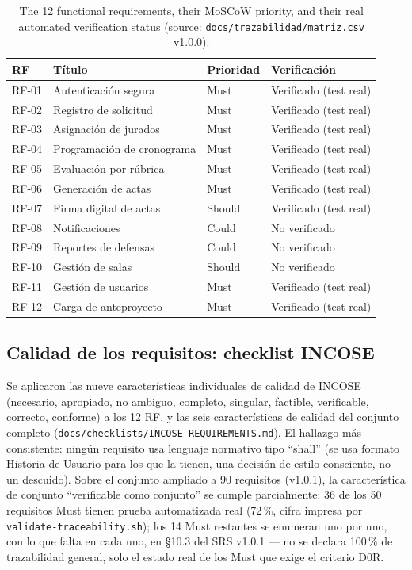 \begin{table}[H]
\centering
\small
\begin{tabular}{p{1.2cm}p{5.5cm}p{1.6cm}p{2.5cm}}
\toprule
\textbf{RF} & \textbf{Título} & \textbf{Prioridad} & \textbf{Verificación} \\
\midrule
RF-01 & Autenticación segura & Must & Verificado (test real) \\
RF-02 & Registro de solicitud & Must & Verificado (test real) \\
RF-03 & Asignación de jurados & Must & Verificado (test real) \\
RF-04 & Programación de cronograma & Must & Verificado (test real) \\
RF-05 & Evaluación por rúbrica & Must & Verificado (test real) \\
RF-06 & Generación de actas & Must & Verificado (test real) \\
RF-07 & Firma digital de actas & Should & Verificado (test real) \\
RF-08 & Notificaciones & Could & No verificado \\
RF-09 & Reportes de defensas & Could & No verificado \\
RF-10 & Gestión de salas & Should & No verificado \\
RF-11 & Gestión de usuarios & Must & Verificado (test real) \\
RF-12 & Carga de anteproyecto & Must & Verificado (test real) \\
\bottomrule
\end{tabular}
\caption{The 12 functional requirements, their MoSCoW priority, and their real automated
verification status (source: \texttt{docs/trazabilidad/matriz.csv} v1.0.0).}
\label{tab:rf-resumen}
\end{table}

\subsection{Calidad de los requisitos: checklist INCOSE}

Se aplicaron las nueve características individuales de calidad de INCOSE \cite{incose2023} (necesario,
apropiado, no ambiguo, completo, singular, factible, verificable, correcto, conforme) a los 12 RF, y las
seis características de calidad del conjunto completo (\texttt{docs/checklists/INCOSE-REQUIREMENTS.md}).
El hallazgo más consistente: ningún requisito usa lenguaje normativo tipo ``shall'' (se usa formato
Historia de Usuario para los que la tienen, una decisión de estilo consciente, no un descuido). Sobre el
conjunto ampliado a 90 requisitos (v1.0.1), la característica de conjunto ``verificable como conjunto''
se cumple parcialmente: 36 de los 50 requisitos Must tienen prueba automatizada real (72\,\%, cifra
impresa por \texttt{validate-traceability.sh}); los 14 Must restantes se enumeran uno por uno, con lo
que falta en cada uno, en \S10.3 del SRS v1.0.1 --- no se declara 100\,\% de trazabilidad general, solo
el estado real de los Must que exige el criterio D0R.

